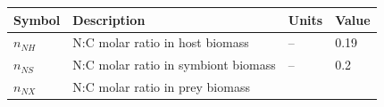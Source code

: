 \documentclass[]{elsarticle} %
\begin{document}
\begin{longtable}[c]{@{}llll@{}}
\toprule
\begin{minipage}[b]{0.10\columnwidth}\raggedright\strut
Symbol
\strut\end{minipage} &
\begin{minipage}[b]{0.48\columnwidth}\raggedright\strut
Description
\strut\end{minipage} &
\begin{minipage}[b]{0.25\columnwidth}\raggedright\strut
Units
\strut\end{minipage} &
\begin{minipage}[b]{0.10\columnwidth}\raggedright\strut
Value
\strut\end{minipage}\tabularnewline
\midrule
\endhead
\begin{minipage}[t]{0.10\columnwidth}\raggedright\strut
\(n_{NH}\)
\strut\end{minipage} &
\begin{minipage}[t]{0.48\columnwidth}\raggedright\strut
N:C molar ratio in host biomass
\strut\end{minipage} &
\begin{minipage}[t]{0.25\columnwidth}\raggedright\strut
--
\strut\end{minipage} &
\begin{minipage}[t]{0.10\columnwidth}\raggedright\strut
0.19
\strut\end{minipage}\tabularnewline
\begin{minipage}[t]{0.10\columnwidth}\raggedright\strut
\(n_{NS}\)
\strut\end{minipage} &
\begin{minipage}[t]{0.48\columnwidth}\raggedright\strut
N:C molar ratio in symbiont biomass
\strut\end{minipage} &
\begin{minipage}[t]{0.25\columnwidth}\raggedright\strut
--
\strut\end{minipage} &
\begin{minipage}[t]{0.10\columnwidth}\raggedright\strut
0.2
\strut\end{minipage}\tabularnewline
\begin{minipage}[t]{0.10\columnwidth}\raggedright\strut
\(n_{NX}\)
\strut\end{minipage} &
\begin{minipage}[t]{0.48\columnwidth}\raggedright\strut
N:C molar ratio in prey biomass
\strut\end{minipage} &
\begin{minipage}[t]{0.25\columnwidth}\raggedright\strut

\end{minipage}
\end{longtable}
\end{document}
